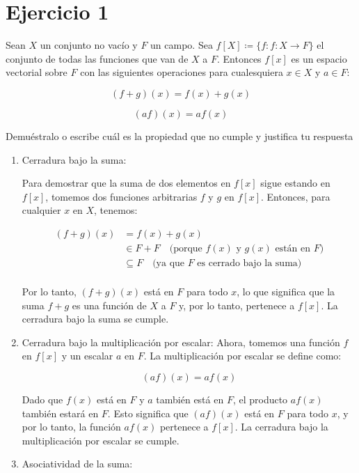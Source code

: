 \section*{Ejercicio 1}

Sean $X$ un conjunto no vacío y $F$ un campo.
Sea $f[X] \coloneqq \{f : f \colon X\to F\}$ el conjunto de todas las funciones que van de $X$ a $F$. Entonces $f[x]$ es un espacio vectorial sobre $F$ con las siguientes operaciones para cualesquiera $x \in X$ y $a \in F$:

$$(f+g)(x) = f(x) + g(x)$$

$$(af)(x) = a f(x)$$


Demuéstralo o escribe cuál es la propiedad que no cumple y justifica tu respuesta
\begin{enumerate}
    \item Cerradura bajo la suma: 
    
    Para demostrar que la suma de dos elementos en $f[x]$ sigue estando en $f[x]$, tomemos dos funciones arbitrarias $f$ y $g$ en $f[x]$. Entonces, para cualquier $x$ en $X$, tenemos:
    
    \begin{align*}
        (f + g)(x) &= f(x) + g(x) \\
        &\in F + F \quad \text{(porque } f(x) \text{ y } g(x) \text{ están en } F\text{)} \\
        &\subseteq F \quad \text{(ya que } F \text{ es cerrado bajo la suma)} \\
    \end{align*}
    
    Por lo tanto, $(f + g)(x)$ está en $F$ para todo $x$, lo que significa que la suma $f + g$ es una función de $X$ a $F$ y, por lo tanto, pertenece a $f[x]$. La cerradura bajo la suma se cumple.

    \item Cerradura bajo la multiplicación por escalar: Ahora, tomemos una función $f$ en $f[x]$ y un escalar $a$ en $F$. La multiplicación por escalar se define como:
    
    $$(af)(x) = af(x) $$

    Dado que $f(x)$ está en $F$ y $a$ también está en $F$, el producto $af(x)$ también estará en $F$. Esto significa que $(af)(x)$ está en $F$ para todo $x$, y por lo tanto, la función $af(x)$ pertenece a $f[x]$. La cerradura bajo la multiplicación por escalar se cumple.

    \item Asociatividad de la suma: 
    

\end{enumerate}
